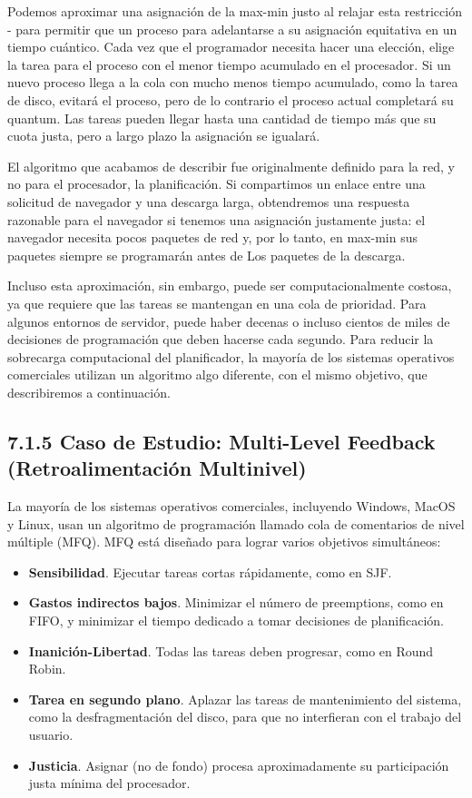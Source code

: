 \documentclass[10pt]{book}
\begin{document}
Podemos aproximar una asignación de la max-min justo al relajar esta restricción - para permitir que un proceso para adelantarse a su asignación equitativa en un tiempo cuántico. Cada vez que el programador necesita hacer una elección, elige la tarea para el proceso con el menor tiempo acumulado en el procesador. Si un nuevo proceso llega a la cola con mucho menos tiempo acumulado, como la tarea de disco, evitará el proceso, pero de lo contrario el proceso actual completará su quantum. Las tareas pueden llegar hasta una cantidad de tiempo más que su cuota justa, pero a largo plazo la asignación se igualará.

El algoritmo que acabamos de describir fue originalmente definido para la red, y no para el procesador, la planificación. Si compartimos un enlace entre una solicitud de navegador y una descarga larga, obtendremos una respuesta razonable para el navegador si tenemos una asignación justamente justa: el navegador necesita pocos paquetes de red y, por lo tanto, en max-min sus paquetes siempre se programarán antes de Los paquetes de la descarga.

Incluso esta aproximación, sin embargo, puede ser computacionalmente costosa, ya que requiere que las tareas se mantengan en una cola de prioridad. Para algunos entornos de servidor, puede haber decenas o incluso cientos de miles de decisiones de programación que deben hacerse cada segundo. Para reducir la sobrecarga computacional del planificador, la mayoría de los sistemas operativos comerciales utilizan un algoritmo algo diferente, con el mismo objetivo, que describiremos a continuación.

\subsection{7.1.5 Caso de Estudio: Multi-Level Feedback (Retroalimentación Multinivel)}
La mayoría de los sistemas operativos comerciales, incluyendo Windows, MacOS y Linux, usan un algoritmo de programación llamado cola de comentarios de nivel múltiple (MFQ). MFQ está diseñado para lograr varios objetivos simultáneos:
\begin{itemize}
\item \textbf{Sensibilidad}. Ejecutar tareas cortas rápidamente, como en SJF.
\item \textbf{Gastos indirectos bajos}. Minimizar el número de preemptions, como en FIFO, y minimizar el tiempo dedicado a tomar decisiones de planificación.
\item \textbf{Inanición-Libertad}. Todas las tareas deben progresar, como en Round Robin.
\item \textbf{Tarea en segundo plano}. Aplazar las tareas de mantenimiento del sistema, como la desfragmentación del disco, para que no interfieran con el trabajo del usuario.
\item \textbf{Justicia}. Asignar (no de fondo) procesa aproximadamente su participación justa mínima del procesador.
\end{itemize}
\end{document}
